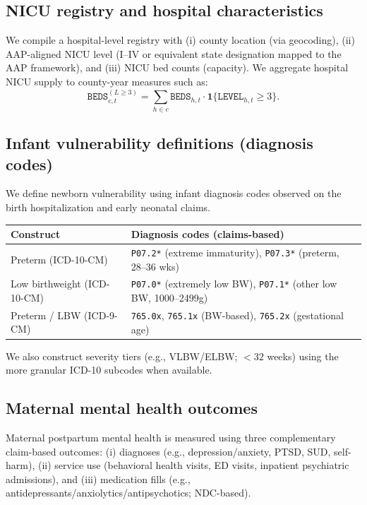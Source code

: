 \documentclass[12pt]{article}
\begin{document}
\subsection{NICU registry and hospital characteristics}
We compile a hospital-level registry with (i) county location (via geocoding), (ii) AAP-aligned NICU level (I--IV or equivalent state designation mapped to the AAP framework), and (iii) NICU bed counts (capacity). We aggregate hospital NICU supply to county-year measures such as:
\[
\texttt{BEDS}_{c,t}^{(L\geq 3)} = \sum_{h \in c} \texttt{BEDS}_{h,t}\cdot \mathbf{1}\{\texttt{LEVEL}_{h,t}\geq 3\}.
\]

\subsection{Infant vulnerability definitions (diagnosis codes)}
We define newborn vulnerability using infant diagnosis codes observed on the birth hospitalization and early neonatal claims.

\begin{center}
\begin{tabular}{l l}
\toprule
\textbf{Construct} & \textbf{Diagnosis codes (claims-based)} \\
\midrule
Preterm (ICD-10-CM) & \texttt{P07.2*} (extreme immaturity), \texttt{P07.3*} (preterm, 28--36 wks) \\
Low birthweight (ICD-10-CM) & \texttt{P07.0*} (extremely low BW), \texttt{P07.1*} (other low BW, 1000--2499g) \\
Preterm / LBW (ICD-9-CM) & \texttt{765.0x}, \texttt{765.1x} (BW-based), \texttt{765.2x} (gestational age) \\
\bottomrule
\end{tabular}
\end{center}

We also construct severity tiers (e.g., VLBW/ELBW; $<32$ weeks) using the more granular ICD-10 subcodes when available.

\subsection{Maternal mental health outcomes}
Maternal postpartum mental health is measured using three complementary claim-based outcomes:
(i) diagnoses (e.g., depression/anxiety, PTSD, SUD, self-harm),
(ii) service use (behavioral health visits, ED visits, inpatient psychiatric admissions),
and (iii) medication fills (e.g., antidepressants/anxiolytics/antipsychotics; NDC-based).
\end{document}
